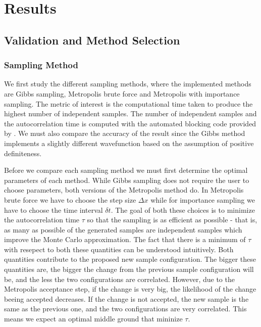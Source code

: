 \documentclass[twoside,english]{uiofysmaster}
\begin{document}
\chapter{Results}

\section{Validation and Method Selection}



\subsection{Sampling Method}
We first study the different sampling methods, where the implemented methods are Gibbs sampling, Metropolis brute force and Metropolis with importance sampling. The metric of interest is the computational time taken to produce the highest number of independent samples. The number of independent samples and the autocorrelation time is computed with the automated blocking code provided by \cite{Jonsson2018}. We must also compare the accuracy of the result since the Gibbs method implements a slightly different wavefunction based on the assumption of positive definiteness. 

Before we compare each sampling method we must first determine the optimal parameters of each method. While Gibbs sampling does not require the user to choose parameters, both versions of the Metropolis method do. In Metropolis brute force we have to choose the step size $\Delta x$ while for importance sampling we have to choose the time interval $\delta t$. The goal of both these choices is to minimize the autocorrelation time $\tau$ so that the sampling is as efficient as possible - that is, as many as possible of the generated samples are independent samples which improve the Monte Carlo approximation. The fact that there is a minimum of $\tau$ with resepect to both these quantities can be understood intuitively. Both quantities contribute to the proposed new sample configuration. The bigger these quantities are, the bigger the change from the previous sample configuration will be, and the less the two configurations are correlated. However, due to the Metropolis acceptance step, if the change is very big, the likelihood of the change beeing accepted decreases. If the change is not accepted, the new sample is the same as the previous one, and the two configurations are very correlated. This means we expect an optimal middle ground that mininize $\tau$.
\end{document}
